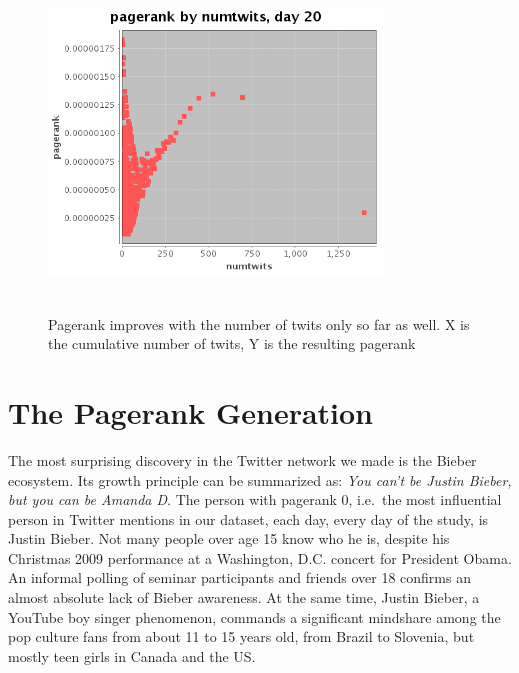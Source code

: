 \documentclass[10pt,oneside]{memoir}
\begin{document}
\begin{Spacing}{2}
\begin{figure}
\begin{center}
\includegraphics[height=3.5in,width=3.5in]{figures/points-ctwits-prank-20}
\caption{Pagerank improves with the number of twits only so far as well.  X is the cumulative number of twits, Y is the resulting pagerank} 
\label{figure:ctwits-prank}
\end{center}
\end{figure}
\pagebreak \section{The Pagerank Generation}
\label{thepagerankgeneration}

\label{section:pagerank-generation}


The most surprising discovery in the Twitter network we made is the Bieber ecosystem.  Its growth principle can be summarized as: {\itshape You can't be Justin Bieber, but you can be Amanda D}.  The person with pagerank 0, i.e.\ the most influential person in Twitter mentions in our dataset, each day, every day of the study, is Justin Bieber.  Not many people over age 15 know who he is, despite his Christmas 2009 performance at a Washington, D.C. concert for President Obama.  An informal polling of seminar participants and friends over 18 confirms an almost absolute lack of Bieber awareness.  At the same time, Justin Bieber, a YouTube boy singer phenomenon, commands a significant mindshare among the pop culture fans from about 11 to 15 years old, from Brazil to Slovenia, but mostly teen girls in Canada and the US.



\end{Spacing}
\end{document}
